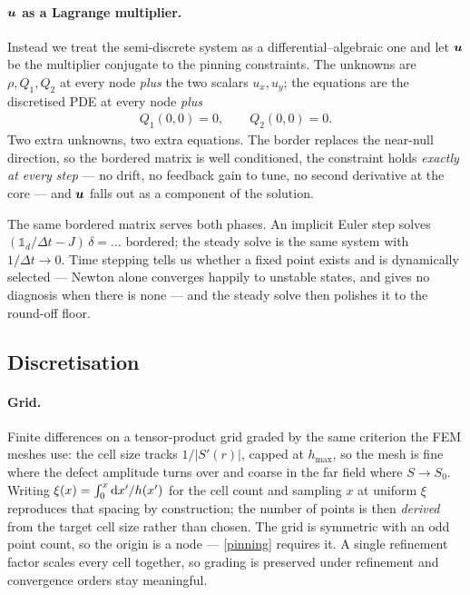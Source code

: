 \documentclass[a5paper]{article}
\begin{document}
\paragraph{$\boldsymbol{u}$ as a Lagrange multiplier.} Instead we treat the semi-discrete system as a differential--algebraic one and let $\boldsymbol{u}$ be the multiplier conjugate to the pinning constraints. The unknowns are $\rho, Q_1, Q_2$ at every node \emph{plus} the two scalars $u_x, u_y$; the equations are the discretised PDE at every node \emph{plus}
\begin{align}
    \label{pinning}
    Q_1(0,0) = 0, \qquad Q_2(0,0) = 0 .
\end{align}
Two extra unknowns, two extra equations. The border replaces the near-null direction, so the bordered matrix is well conditioned, the constraint holds \emph{exactly at every step} --- no drift, no feedback gain to tune, no second derivative at the core --- and $\boldsymbol{u}$ falls out as a component of the solution.

The same bordered matrix serves both phases. An implicit Euler step solves $(\mathbb{1}_d/\Delta t - J)\,\delta = \dots$ bordered; the steady solve is the same system with $1/\Delta t \to 0$. Time stepping tells us whether a fixed point exists and is dynamically selected --- Newton alone converges happily to unstable states, and gives no diagnosis when there is none --- and the steady solve then polishes it to the round-off floor.

\subsection{Discretisation}
\label{sec-comoving-discretisation}

\paragraph{Grid.} Finite differences on a tensor-product grid graded by the same criterion the FEM meshes use: the cell size tracks $1/|S'(r)|$, capped at $h_\text{max}$, so the mesh is fine where the defect amplitude turns over and coarse in the far field where $S \to S_0$. Writing $\xi(x) = \int_0^x \mathrm{d} x'/h(x')$ for the cell count and sampling $x$ at uniform $\xi$ reproduces that spacing by construction; the number of points is then \emph{derived} from the target cell size rather than chosen. The grid is symmetric with an odd point count, so the origin is a node --- \eqref{pinning} requires it. A single refinement factor scales every cell together, so grading is preserved under refinement and convergence orders stay meaningful.
\end{document}
